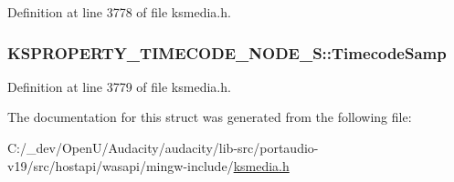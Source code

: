Definition at line 3778 of file ksmedia.\+h.

\subsubsection[{\texorpdfstring{Timecode\+Samp}{TimecodeSamp}}]{ K\+S\+P\+R\+O\+P\+E\+R\+T\+Y\+\_\+\+T\+I\+M\+E\+C\+O\+D\+E\+\_\+\+N\+O\+D\+E\+\_\+\+S\+::\+Timecode\+Samp}\hypertarget{struct_k_s_p_r_o_p_e_r_t_y___t_i_m_e_c_o_d_e___n_o_d_e___s_ab95cda174a80c9d4406236ec46ba813d}{}\label{struct_k_s_p_r_o_p_e_r_t_y___t_i_m_e_c_o_d_e___n_o_d_e___s_ab95cda174a80c9d4406236ec46ba813d}


Definition at line 3779 of file ksmedia.\+h.



The documentation for this struct was generated from the following file\+:\begin{DoxyCompactItemize}
\item 
C\+:/\+\_\+dev/\+Open\+U/\+Audacity/audacity/lib-\/src/portaudio-\/v19/src/hostapi/wasapi/mingw-\/include/\hyperlink{ksmedia_8h}{ksmedia.\+h}\end{DoxyCompactItemize}
